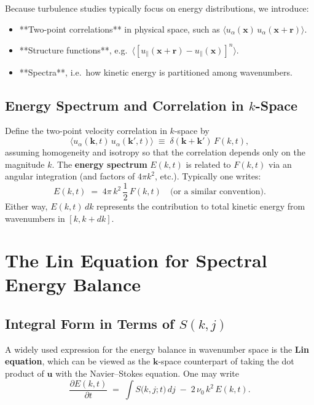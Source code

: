 \documentclass[12pt,a4paper]{article}
\newcommand\ub{\mathbf{u}}   %
\newcommand\x{\mathbf{x}}    %
\newcommand\kvec{\mathbf{k}} %
\begin{document}
Because turbulence studies typically focus on energy distributions, we introduce:
\begin{itemize}
\item **Two-point correlations** in physical space, such as 
  \(\langle u_\alpha(\x)\,u_\alpha(\x+\mathbf{r})\rangle\).
\item **Structure functions**, e.g.\ 
  \(\langle [u_{\parallel}(\x+\mathbf{r}) - u_{\parallel}(\x)]^n \rangle\).
\item **Spectra**, i.e.\ how kinetic energy is partitioned among wavenumbers.
\end{itemize}

\subsection{Energy Spectrum and Correlation in \boldmath$k$-Space}

Define the two-point velocity correlation in \(k\)-space by
\begin{equation}
\langle u_\alpha(\kvec,t)\,u_\alpha(\kvec',t)\rangle
\;\equiv\; \delta(\kvec+\kvec')\,F(k,t),
\end{equation}
assuming homogeneity and isotropy so that the correlation depends only on the magnitude \(k\).  The \textbf{energy spectrum} \(E(k,t)\) is related to \(F(k,t)\) via an angular integration (and factors of \(4\pi k^2\), etc.).  Typically one writes:
\begin{equation}
E(k,t)
\;=\;
4\pi\,k^2\,\frac{1}{2}\,F(k,t)
\quad
\text{(or a similar convention).}
\end{equation}
Either way, \(E(k,t)\,dk\) represents the contribution to total kinetic energy from wave\-numbers in \([k,k+dk]\).

\section{The Lin Equation for Spectral Energy Balance}

\subsection{Integral Form in Terms of \boldmath$S(k,j)$}
A widely used expression for the energy balance in wave\-number space is the \textbf{Lin equation}, which can be viewed as the \(\kvec\)-space counterpart of taking the dot product of \(\ub\) with the Navier--Stokes equation.  One may write
\begin{equation}
  \frac{\partial E(k,t)}{\partial t}
  \;=\;
  \int S\bigl(k,j;t\bigr)\,d j
  \;-\;2\,\nu_0\,k^2\,E(k,t).
\label{eq:LinEq_general}
\end{equation}
\end{document}
